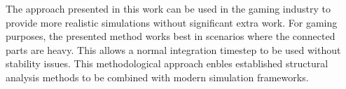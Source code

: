 The approach presented in this work can be used in the gaming industry to provide more realistic 
simulations without significant extra work. For gaming purposes, the presented method works 
best in scenarios where the connected parts are heavy. This allows a normal 
integration timestep to be used without stability issues. 
This methodological approach enbles established structural analysis
methods to be combined with modern simulation frameworks.

